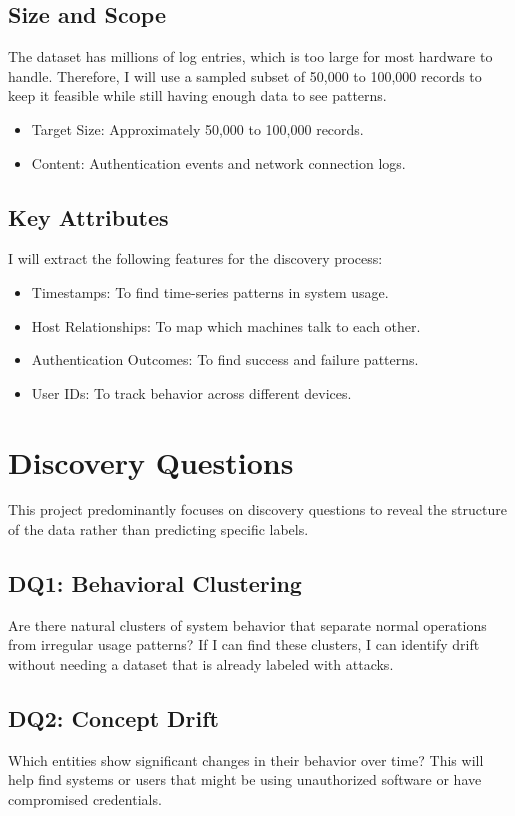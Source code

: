 \documentclass[conference]{IEEEtran}
\begin{document}
\subsection{Size and Scope}
The dataset has millions of log entries, which is too large for most hardware to handle. Therefore, I will use a sampled subset of 50,000 to 100,000 records to keep it feasible while still having enough data to see patterns.
\begin{itemize}
    \item Target Size: Approximately 50,000 to 100,000 records.
    \item Content: Authentication events and network connection logs.
\end{itemize}

\subsection{Key Attributes}
I will extract the following features for the discovery process:
\begin{itemize}
    \item Timestamps: To find time-series patterns in system usage.
    \item Host Relationships: To map which machines talk to each other.
    \item Authentication Outcomes: To find success and failure patterns.
    \item User IDs: To track behavior across different devices.
\end{itemize}

\section{Discovery Questions}
This project predominantly focuses on discovery questions to reveal the structure of the data rather than predicting specific labels.

\subsection{DQ1: Behavioral Clustering}
Are there natural clusters of system behavior that separate normal operations from irregular usage patterns? If I can find these clusters, I can identify drift without needing a dataset that is already labeled with attacks.

\subsection{DQ2: Concept Drift}
Which entities show significant changes in their behavior over time? This will help find systems or users that might be using unauthorized software or have compromised credentials.
\end{document}
